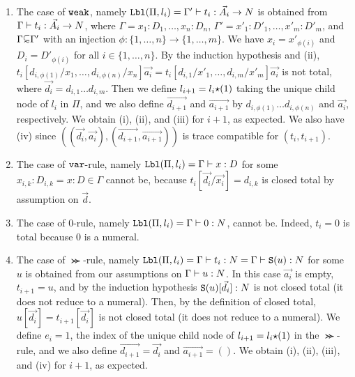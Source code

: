 \documentclass{article}
\newenvironment{proof}[1][Proof]{\begin{trivlist}
\item[\hskip \labelsep {\bfseries #1}]}{\end{trivlist}}
\begin{document}
\begin{proof}

\begin{enumerate}
\item
  The case of ${\tt weak}$, namely
  ${\tt Lbl}(\Pi,l_i) = \Gamma'\vdash t_i:\vec{A_i}\rightarrow{N}$
  is obtained from $\Gamma\vdash t_i:\vec{A_i}\rightarrow{N}$, where
  $\Gamma = x_1:D_1,\ldots,x_n:D_n$, $\Gamma' = x'_1:D'_1,\ldots,x'_m:D'_m$, and $\Gamma \subseteqsim \Gamma'$
  with an injection $\phi:\{1,\ldots,n\}\to\{1,\ldots,m\}$. 
  We have $x_i = x'_{\phi(i)}$ and $D_i = D'_{\phi(i)}$ for all $i \in \{1,\ldots,n\}$.
  By the induction hypothesis and (ii), 
  $t_i[d_{i,\phi(1)}/x_1,\ldots,d_{i,\phi(n)}/x_n]\vec{a_i} 
   = t_i[d_{i,1}/x'_1,\ldots,d_{i,m}/x'_m]\vec{a_i}$ is not total,
  where $\vec{d_i} = d_{i,1}\ldots d_{i,m}$.
  Then we define $l_{i+1} = l_i{\star}(1)$ taking the unique child node of $l_i$ in $\Pi$, and we
  also define $\vec{d_{i+1}}$ and $\vec{a_{i+1}}$ by $d_{i,\phi(1)}\ldots d_{i,\phi(n)}$
  and $\vec{a_i}$, respectively. 
  We obtain (i), (ii), and (iii) for $i+1$, as expected.
  We also have (iv) since $((\vec{d_i},\vec{a_i}),(\vec{d_{i+1}},\vec{a_{i+1}}))$
  is trace compatible for $(t_i,t_{i+1})$. 

\item
  The case of ${\tt var}$-rule, namely ${\tt Lbl}(\Pi,l_i) = \Gamma\vdash x:D$ for some $x_{i,k}:D_{i,k} = x:D \in \Gamma$
  cannot be, because $t_i [\vec{d_i}/\vec{x_i}] = d_{i,k}$ is closed total by assumption on $\vec{d}$.
  
\item
  The case of $0$-rule, namely ${\tt Lbl}(\Pi,l_i) = \Gamma\vdash 0:{N}$, 
cannot be. Indeed, $t_i = 0$ is total because $0$ is a numeral.

\item  
  The case of $\Succ$-rule, namely ${\tt Lbl}(\Pi,l_i) = \Gamma\vdash t_i: {N} = \Gamma\vdash {\tt S}(u): {N}$
  for some $u$ is obtained from our assumptions on
  $\Gamma\vdash u: {N}$. In this case $\vec{a_i}$ is empty, $t_{i+1}=u$, and
  by the induction hypothesis ${\tt S}(u)[\vec{d_i}]:{N}$ is not closed total (it does not reduce to a numeral).
  Then, by the definition of closed total, $u[\vec{d_i}] =t_{i+1}[\vec{d_i}] $ is not closed total
 (it does not reduce to a numeral).
  We define $e_{i}=1$, 
  the index of the unique child node of $l_{i+1}=l_i{\star}(1)$ in the $\Succ$-rule, and
  we also define $\vec{d_{i+1}} = \vec{d_i}$ and $\vec{a_{i+1}} = ()$. 
  We obtain (i), (ii), (iii), and (iv) for $i+1$, as expected.


\end{enumerate}
\end{proof}
\end{document}
